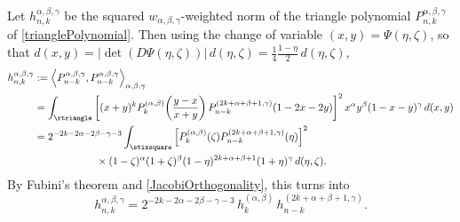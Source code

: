\documentclass{article}
\numberwithin{equation}{section}
\numberwithin{figure}{section}
\begin{document}
Let $h^{\alpha,\beta,\gamma}_{n,k}$ be the squared $w_{\alpha,\beta,\gamma}$-weighted norm of the triangle polynomial $P^{\alpha,\beta,\gamma}_{n,k}$ of \eqref{trianglePolynomial}.
Then using the change of variable $(x,y) = \Psi(\eta,\zeta)$, so that $d(x,y) = \lvert \det(D\Psi(\eta,\zeta)) \rvert \, d(\eta,\zeta) = \frac{1}{4} \frac{1-\eta}{2} \, d(\eta,\zeta)$,
%
\begin{equation*}
\begin{split}
h^{\alpha,\beta,\gamma}_{n,k} & := \left\langle P^{\alpha,\beta,\gamma}_{n-k}, P^{\alpha,\beta,\gamma}_{n-k} \right\rangle_{\alpha,\beta,\gamma}\\
& = \int_\rtriangle \left[ (x+y)^k P^{(\alpha,\beta)}_k\mathopen{}\left( \frac{y-x}{x+y} \mathclose{}\right) P^{(2k+\alpha+\beta+1,\gamma)}_{n-k}(1-2x-2y) \right]^2 x^\alpha y^\beta (1-x-y)^\gamma \, d(x,y)\\
& = 2^{-2k-2\alpha-2\beta-\gamma-3} \int_\stixsquare \left[ P^{(\alpha,\beta)}_k(\zeta) P^{(2k+\alpha+\beta+1,\gamma)}_{n-k}(\eta) \right]^2\\& \qquad\qquad\qquad \times (1-\zeta)^\alpha (1+\zeta)^\beta (1-\eta)^{2k+\alpha+\beta+1} (1+\eta)^\gamma \, d(\eta,\zeta).
\end{split}
\end{equation*}
%
By Fubini's theorem and \eqref{JacobiOrthogonality}, this turns into
%
\begin{equation}\label{trianglePolynomialSquaredNorm}
h^{\alpha,\beta,\gamma}_{n,k} = 2^{-2k-2\alpha-2\beta-\gamma-3} \, h^{(\alpha,\beta)}_k \, h^{(2k+\alpha+\beta+1,\gamma)}_{n-k}.
\end{equation}
%
\end{document}
